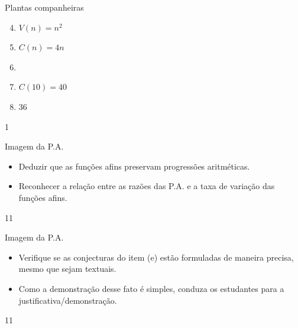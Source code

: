 \begin{answer}{Plantas companheiras}
{
\begin{enumerate}\setcounter{enumi}{3}
\item $V(n)=n^2$

\item $C(n)=4n$
\clearpage
\item {}
{
}

\item $C(10)=40$

\item 36
\end{enumerate}
}{1}
\end{answer}
\begin{objectives}{Imagem da P.A.}
{
\begin{itemize}
\item Deduzir que as funções afins preservam progressões aritméticas.
\item Reconhecer a relação entre as razões das P.A. e a taxa de variação das funções afins.
\end{itemize}
}{1}{1}
\end{objectives}
\marginpar{\vspace{-2em}}
\begin{sugestions}{Imagem da P.A.}
{
\begin{itemize}
\item Verifique se as conjecturas do item (e) estão formuladas de maneira precisa, mesmo que sejam textuais.
\item Como a demonstração desse fato é simples, conduza os estudantes para a justificativa/demonstração.
\end{itemize}
}{1}{1}
\end{sugestions}
